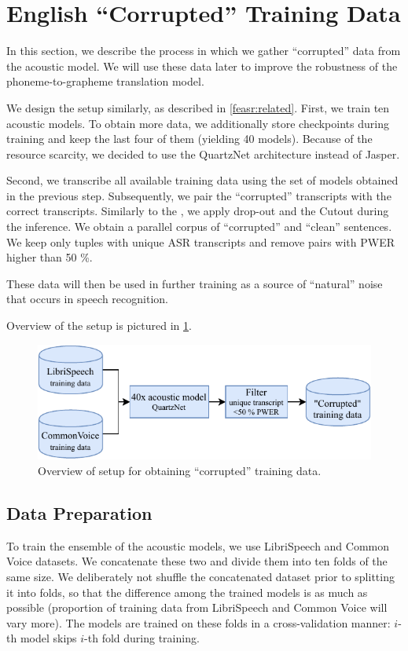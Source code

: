\section{English ``Corrupted'' Training Data}
\label{sec:asr_corrupted}

In this section, we describe the process in which we gather ``corrupted'' data from the acoustic model. We will use these data later to improve the robustness of the phoneme-to-grapheme translation model.

We design the setup similarly, as described in \cref{feasr:related}. First, we train ten acoustic models. To obtain more data, we additionally store checkpoints during training and keep the last four of them (yielding 40 models). Because of the resource scarcity, we decided to use the QuartzNet architecture instead of Jasper.

Second, we transcribe all available training data using the set of models obtained in the previous step. Subsequently, we pair the ``corrupted'' transcripts with the correct transcripts. Similarly to the , we apply drop-out and the Cutout during the inference. We obtain a parallel corpus of ``corrupted'' and ``clean'' sentences. We keep only tuples with unique ASR transcripts and remove pairs with PWER higher than 50 \%.

These data will then be used in further training as a source of ``natural'' noise that occurs in speech recognition.

Overview of the setup is pictured in \cref{fig:asr_folds}.

\begin{figure}[t]
	\includegraphics[width=\linewidth]{img/ensemble_diagram}
	\caption{Overview of setup for obtaining ``corrupted'' training data.}
	\label{fig:asr_folds}
\end{figure}

\subsection{Data Preparation}
To train the ensemble of the acoustic models, we use LibriSpeech and Common Voice datasets. We concatenate these two and divide them into ten folds of the same size. We deliberately not shuffle the concatenated dataset prior to splitting it into folds, so that the difference among the trained models is as much as possible (proportion of training data from LibriSpeech and Common Voice will vary more). The models are trained on these folds in a cross-validation manner: $i$-th model skips $i$-th fold during training.


